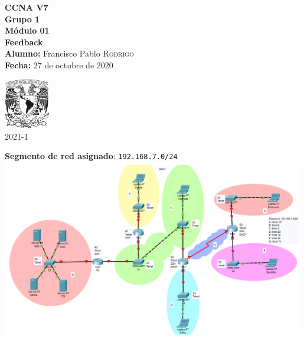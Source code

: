 \documentclass{article}
\newcommand{\materia}{CCNA V7}
\newcommand{\grupo}{1}
\newcommand{\semestre}{2021-1}
\newcommand{\alumno}{Francisco Pablo \textsc{Rodrigo}}
\newcommand{\actividad}{Módulo 01}
\newcommand{\titulo}{Feedback}
\newcommand{\fechaEntrega}{27 de octubre de 2020}
\begin{document}
\begin{minipage}[t]{0.7\linewidth}
    \vspace{-1cm}
    \large{\textbf{\materia}}\\
    \large{\textbf{Grupo \grupo}}\\
    \textbf{\actividad}\\
    \textbf{\titulo} \\

    \large{\textbf{Alumno:} \alumno} \\
    \textbf{Fecha:} \fechaEntrega%
\end{minipage}\hfill
\begin{minipage}[t]{0.2\linewidth}
    \vspace{-1.2cm}
    \begin{flushright}
        \includegraphics[width=2cm]{unam.jpg}\\
        \large{\semestre}    
    \end{flushright}
\end{minipage}
\vspace{5mm}

\textbf{Segmento de red asignado}: \texttt{192.168.7.0/24}\\
\includegraphics[width=\linewidth]{topologia}\\
\end{document}
